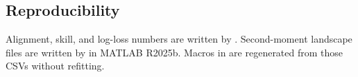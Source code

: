 \subsection{Reproducibility}

Alignment, skill, and log-loss numbers are written by .
Second-moment landscape files are written by  in {MATLAB} {R2025b}.
Macros in  are regenerated from those CSVs without refitting.
